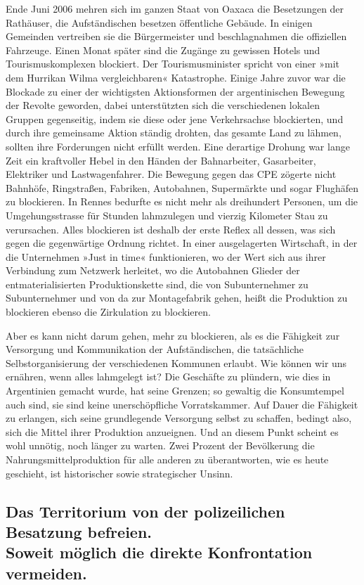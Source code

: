 Ende Juni 2006 mehren sich im ganzen Staat von Oaxaca die
Besetzungen der Rathäuser, die Aufständischen besetzen öffentliche
Gebäude. In einigen Gemeinden vertreiben sie die Bürgermeister und
beschlagnahmen die offiziellen Fahrzeuge. Einen Monat später sind
die Zugänge zu gewissen Hotels und Tourismuskomplexen blockiert.
Der Tourismusminister spricht von einer »mit dem Hurrikan Wilma
vergleichbaren« Katastrophe. Einige Jahre zuvor war die Blockade zu
einer der wichtigsten Aktionsformen der argentinischen Bewegung der
Revolte geworden, dabei unterstützten sich die verschiedenen
lokalen Gruppen gegenseitig, indem sie diese oder jene
Verkehrsachse blockierten, und durch ihre gemeinsame Aktion ständig
drohten, das gesamte Land zu lähmen, sollten ihre Forderungen nicht
erfüllt werden. Eine derartige Drohung war lange Zeit ein
kraftvoller Hebel in den Händen der Bahnarbeiter, Gasarbeiter,
Elektriker und Lastwagenfahrer. Die Bewegung gegen das CPE zögerte
nicht Bahnhöfe, Ringstraßen, Fabriken, Autobahnen, Supermärkte und
sogar Flughäfen zu blockieren. In Rennes bedurfte es nicht mehr als
dreihundert Personen, um die Umgehungsstrasse für Stunden
lahmzulegen und vierzig Kilometer Stau zu verursachen.
Alles blockieren ist deshalb der erste Reflex all dessen, was sich
gegen die gegenwärtige Ordnung richtet. In einer ausgelagerten
Wirtschaft, in der die Unternehmen »Just in time« funktionieren, wo
der Wert sich aus ihrer Verbindung zum Netzwerk herleitet, wo die
Autobahnen Glieder der entmaterialisierten Produktionskette sind,
die von Subunternehmer zu Subunternehmer und von da zur
Montagefabrik gehen, heißt die Produktion zu blockieren ebenso die
Zirkulation zu blockieren.

Aber es kann nicht darum gehen, mehr zu blockieren, als es die
Fähigkeit zur Versorgung und Kommunikation der Aufständischen, die
tatsächliche Selbstorganisierung der verschiedenen Kommunen
erlaubt. Wie können wir uns ernähren, wenn alles lahmgelegt ist?
Die Geschäfte zu plündern, wie dies in Argentinien gemacht wurde,
hat seine Grenzen; so gewaltig die Konsumtempel auch sind, sie sind
keine unerschöpfliche Vorratskammer. Auf Dauer die Fähigkeit zu
erlangen, sich seine grundlegende Versorgung selbst zu schaffen,
bedingt also, sich die Mittel ihrer Produktion anzueignen. Und an
diesem Punkt scheint es wohl unnötig, noch länger zu warten. Zwei
Prozent der Bevölkerung die Nahrungsmittelproduktion für alle
anderen zu überantworten, wie es heute geschieht, ist historischer
sowie strategischer Unsinn.

\subsection{Das Territorium von der polizeilichen Besatzung befreien.\\
Soweit möglich die direkte Konfrontation vermeiden.}

